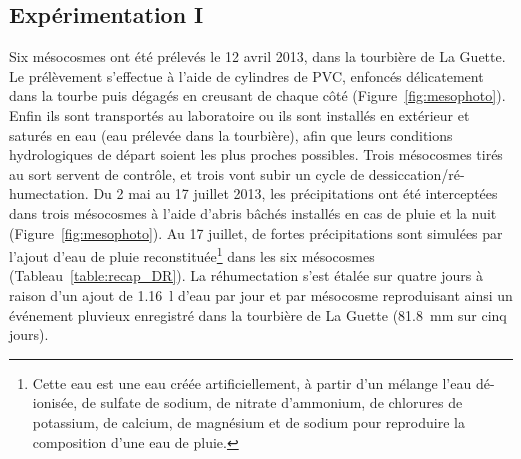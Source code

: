 \subsection{Expérimentation I}
Six mésocosmes ont été prélevés le 12 avril 2013, dans la tourbière de La Guette.
Le prélèvement s'effectue à l'aide de cylindres de PVC, enfoncés délicatement dans la tourbe puis dégagés en creusant de chaque côté (Figure~\ref{fig:mesophoto}).
Enfin ils sont transportés au laboratoire ou ils sont installés en extérieur et saturés en eau (eau prélevée dans la tourbière), afin que leurs conditions hydrologiques de départ soient les plus proches possibles.
Trois mésocosmes tirés au sort servent de contrôle, et trois vont subir un cycle de dessiccation/ré-humectation.
Du 2 mai au 17 juillet 2013, les précipitations ont été interceptées dans trois mésocosmes à l'aide d'abris bâchés installés en cas de pluie et la nuit (Figure~\ref{fig:mesophoto}).
Au 17 juillet, de fortes précipitations sont simulées par l'ajout d'eau de pluie reconstituée\footnote{Cette eau est une eau créée artificiellement, à partir d'un mélange l'eau dé-ionisée, de sulfate de sodium, de nitrate d'ammonium, de chlorures de potassium, de calcium, de magnésium et de sodium pour reproduire la composition d'une eau de pluie.} dans les six mésocosmes (Tableau~\ref{table:recap_DR}).
La réhumectation s'est étalée sur quatre jours à raison d'un ajout de \SI{1.16}{\litre} d'eau par jour et par mésocosme reproduisant ainsi un événement pluvieux enregistré dans la tourbière de La Guette (\SI{81.8}{\milli\metre} sur cinq jours).

